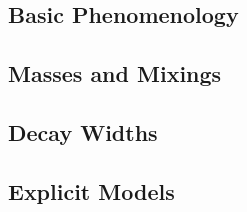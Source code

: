 \subsection{Basic Phenomenology}
\subsection*{Masses and Mixings}



\subsection*{Decay Widths}




\subsection{Explicit Models}
